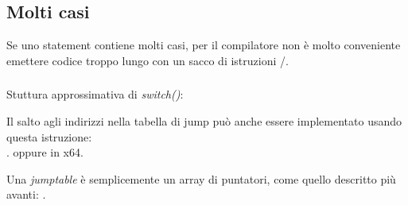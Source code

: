 \subsection{Molti casi}

Se uno statement  contiene molti casi, per il compilatore non è molto conveniente emettere codice troppo lungo con un sacco di 
istruzioni \JE/\JNE.







\subsubsection{\Conclusion{}}

Stuttura approssimativa di \emph{switch()}:



Il salto agli indirizzi nella tabella di jump può anche essere implementato usando questa istruzione: \\
.
oppure  in x64.

Una \emph{jumptable} è semplicemente un array di puntatori, come quello descritto più avanti: .
